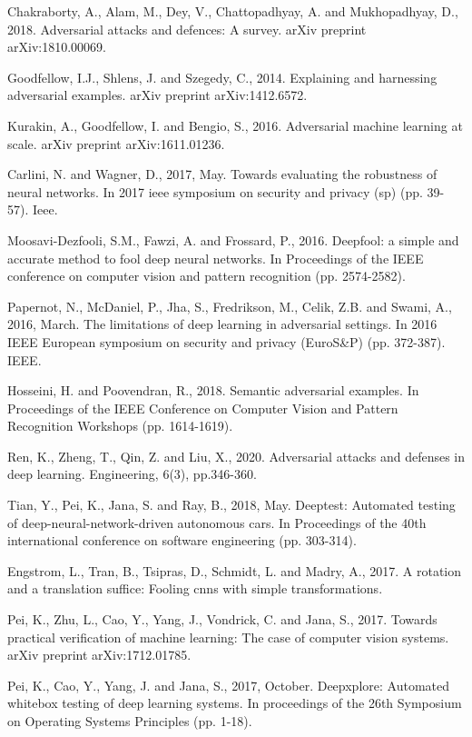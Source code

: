 \begin{singlespace}
\begin{thebibliography}{}
 Chakraborty, A., Alam, M., Dey, V., Chattopadhyay, A. and Mukhopadhyay, D., 2018. Adversarial attacks and defences: A survey. arXiv preprint arXiv:1810.00069.

 Goodfellow, I.J., Shlens, J. and Szegedy, C., 2014. Explaining and harnessing adversarial examples. arXiv preprint arXiv:1412.6572.  


 Kurakin, A., Goodfellow, I. and Bengio, S., 2016. Adversarial machine learning at scale. arXiv preprint arXiv:1611.01236.

 Carlini, N. and Wagner, D., 2017, May. Towards evaluating the robustness of neural networks. In 2017 ieee symposium on security and privacy (sp) (pp. 39-57). Ieee.

 Moosavi-Dezfooli, S.M., Fawzi, A. and Frossard, P., 2016. Deepfool: a simple and accurate method to fool deep neural networks. In Proceedings of the IEEE conference on computer vision and pattern recognition (pp. 2574-2582).

 Papernot, N., McDaniel, P., Jha, S., Fredrikson, M., Celik, Z.B. and Swami, A., 2016, March. The limitations of deep learning in adversarial settings. In 2016 IEEE European symposium on security and privacy (EuroS\&P) (pp. 372-387). IEEE.

Hosseini, H. and Poovendran, R., 2018. Semantic adversarial examples. In Proceedings of the IEEE Conference on Computer Vision and Pattern Recognition Workshops (pp. 1614-1619).

Ren, K., Zheng, T., Qin, Z. and Liu, X., 2020. Adversarial attacks and defenses in deep learning. Engineering, 6(3), pp.346-360.

Tian, Y., Pei, K., Jana, S. and Ray, B., 2018, May. Deeptest: Automated testing of deep-neural-network-driven autonomous cars. In Proceedings of the 40th international conference on software engineering (pp. 303-314).


Engstrom, L., Tran, B., Tsipras, D., Schmidt, L. and Madry, A., 2017. A rotation and a translation suffice: Fooling cnns with simple transformations.

Pei, K., Zhu, L., Cao, Y., Yang, J., Vondrick, C. and Jana, S., 2017. Towards practical verification of machine learning: The case of computer vision systems. arXiv preprint arXiv:1712.01785.

  
 Pei, K., Cao, Y., Yang, J. and Jana, S., 2017, October. Deepxplore: Automated whitebox testing of deep learning systems. In proceedings of the 26th Symposium on Operating Systems Principles (pp. 1-18).


\end{thebibliography}
\end{singlespace}

